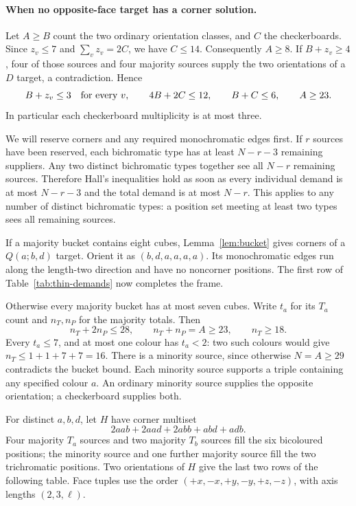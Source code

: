 \paragraph{When no opposite-face target has a corner solution.}
Let $A\ge B$ count the two ordinary orientation classes, and $C$ the
checkerboards. Since $z_v\le7$ and $\sum_v z_v=2C$, we have $C\le14$.
Consequently $A\ge8$. If $B+z_v\ge4$, four of those sources and four
majority sources supply the two orientations of a $D$ target, a
contradiction. Hence
\begin{equation}\label{eq:thin-minority}
 B+z_v\le3\quad\hbox{for every }v,\qquad
 4B+2C\le12,\qquad B+C\le6,\qquad A\ge23.
\end{equation}
In particular each checkerboard multiplicity is at most three.

We will reserve corners and any required monochromatic edges first.
If $r$ sources have been reserved, each bichromatic type has at least
$N-r-3$ remaining suppliers. Any two distinct bichromatic types together
see all $N-r$ remaining sources. Therefore Hall's inequalities hold as soon
as every individual demand is at most $N-r-3$ and the total demand is at
most $N-r$. This applies to any number of distinct bichromatic types:
a position set meeting at least two types sees all remaining sources.

If a majority bucket contains eight cubes, Lemma~\ref{lem:bucket} gives
corners of a $Q(a;b,d)$ target. Orient it as $(b,d,a,a,a,a)$.
Its monochromatic edges run along the length-two direction and have no
noncorner positions. The first row of Table~\ref{tab:thin-demands} now
completes the frame.

Otherwise every majority bucket has at most seven cubes. Write $t_a$ for
its $T_a$ count and $n_T,n_P$ for the majority totals. Then
\[
 n_T+2n_P\le28,\qquad n_T+n_P=A\ge23,\qquad n_T\ge18.
\]
Every $t_a\le7$, and at most one colour has $t_a<2$: two such colours
would give $n_T\le1+1+7+7=16$. There is a minority source, since otherwise
$N=A\ge29$ contradicts the bucket bound. Each minority source supports a
triple containing any specified colour $a$. An ordinary minority source
supplies the opposite orientation; a checkerboard supplies both.

For distinct $a,b,d$, let $H$ have corner multiset
\[
 2aab+2aad+2abb+abd+adb.
\]
Four majority $T_a$ sources and two majority $T_b$ sources fill the six
bicoloured positions; the minority source and one further majority source
fill the two trichromatic positions. Two orientations of $H$ give the
last two rows of the following table. Face tuples use the order
$(+x,-x,+y,-y,+z,-z)$, with axis lengths $(2,3,\ell)$.

